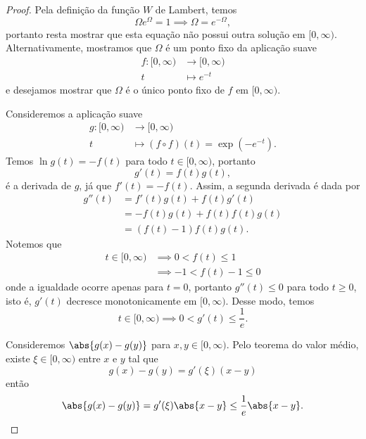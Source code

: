 \begin{proof}
    Pela definição da função \(W\) de Lambert, temos
    \begin{equation*}
        \Omega e^\Omega = 1 \implies \Omega = e^{-\Omega},
    \end{equation*}
    portanto resta mostrar que esta equação não possui outra solução em \([0,\infty)\). Alternativamente, mostramos que \(\Omega\) é um ponto fixo da aplicação suave
    \begin{align*}
        f : [0, \infty) &\to [0, \infty)\\
                      t &\mapsto e^{-t}
    \end{align*}
    e desejamos mostrar que \(\Omega\) é o único ponto fixo de \(f\) em \([0,\infty)\).

    Consideremos a aplicação suave
    \begin{align*}
        g : [0, \infty) &\to [0,\infty)\\
                      t &\mapsto (f\circ f)(t) = \exp{\left(-e^{-t}\right)}.
    \end{align*}
    Temos \(\ln{g(t)} = -f(t)\) para todo \(t \in [0,\infty)\), portanto
    \begin{equation*}
        g'(t) = f(t) g(t),
    \end{equation*}
    é a derivada de \(g\), já que \(f'(t) = -f(t)\). Assim, a segunda derivada é dada por
    \begin{align*}
        g''(t) &= f'(t)g(t) + f(t)g'(t)\\
               &= -f(t) g(t) + f(t) f(t) g(t)\\
               &= \left(f(t) - 1\right) f(t) g(t).
    \end{align*}
    Notemos que
    \begin{align*}
        t \in [0, \infty) &\implies 0 < f(t) \leq 1\\
                          &\implies -1 < f(t) - 1 \leq 0
    \end{align*}
    onde a igualdade ocorre apenas para \(t = 0\), portanto \(g''(t) \leq 0\) para todo \(t \geq 0\), isto é, \(g'(t)\) decresce monotonicamente em \([0, \infty)\). Desse modo, temos
    \begin{equation*}
        t \in [0, \infty) \implies 0 < g'(t) \leq \frac1e.
    \end{equation*}

    Consideremos \(\abs{g(x) - g(y)}\) para \(x,y \in [0,\infty)\). Pelo teorema do valor médio, existe \(\xi \in [0, \infty)\) entre \(x\) e \(y\) tal que
    \begin{equation*}
        g(x) - g(y) = g'(\xi) (x-y)
    \end{equation*}
    então
    \begin{equation*}
        \abs{g(x) - g(y)} = g'(\xi)\abs{x - y} \leq \frac1e \abs{x - y}.
    \end{equation*}


\end{proof}
